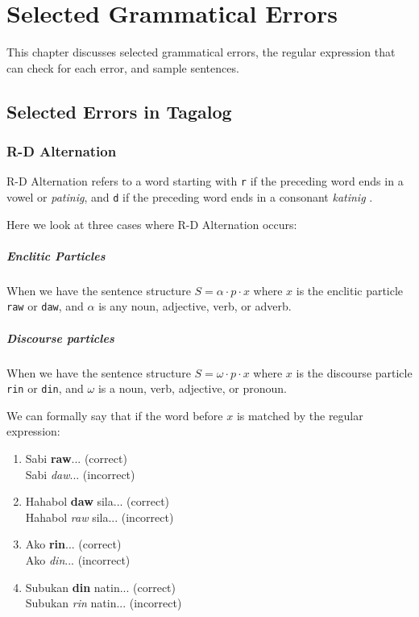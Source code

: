 \chapter{Selected Grammatical Errors}
This chapter discusses selected grammatical errors, the regular expression that can check for each error, and sample sentences.

\section{Selected Errors in Tagalog}
\subsection{R-D Alternation}

R-D Alternation refers to a word starting with \texttt{r} if the preceding word ends in a vowel or \textit{patinig}, and \texttt{d} if the preceding word ends in a consonant \textit{katinig} \cite{KWF, OOP}. 

Here we look at three cases where R-D Alternation occurs:

\paragraph{Enclitic Particles} When we have the sentence structure \(S = \alpha \cdot p \cdot x\) where $x$ is the enclitic particle \texttt{raw} or \texttt{daw}, and \(\alpha\) is any noun, adjective, verb, or adverb. 

\paragraph{Discourse particles} When we have the sentence structure $S = \omega \cdot p \cdot x$ where $x$ is the discourse particle \texttt{rin} or \texttt{din}, and $\omega$ is a noun, verb, adjective, or pronoun.

We can formally say that if the word before $x$ is matched by the regular expression:

\begin{example}
\end{example}

\begin{enumerate}
    \item Sabi \textbf{raw}... (correct)
        \\ Sabi \textit{daw}... (incorrect)
    \item Hahabol \textbf{daw} sila... (correct)
        \\ Hahabol \textit{raw} sila... (incorrect)
    \item Ako \textbf{rin}... (correct)
        \\ Ako \textit{din}... (incorrect)
    \item Subukan \textbf{din} natin... (correct)
        \\ Subukan \textit{rin} natin... (incorrect)
\end{enumerate}

